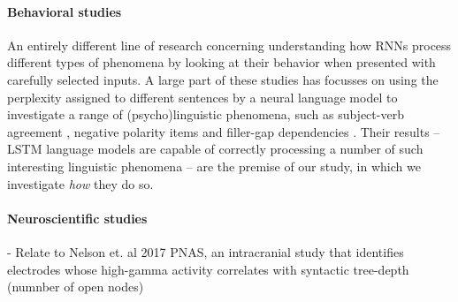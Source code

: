 \paragraph{Behavioral studies}
An entirely different line of research concerning understanding how RNNs process different types of phenomena by looking at their behavior when presented with carefully selected inputs.
A large part of these studies has focusses on using the perplexity assigned to different sentences by a neural language model to investigate a range of (psycho)linguistic phenomena, such as subject-verb agreement \cite{Linzen:etal:2016,Bernardy:Lappin:2017,Gulordava:etal:2018,Kuncoro:etal:2018a,Kuncoro:etal:2018b,Linzen:Leonard:2018}, negative polarity items \cite{marvin2018targeted,jumelet2018language} and filler-gap dependencies \cite{wilcox2018rnn}.
Their results -- LSTM language models are capable of correctly processing a number of such interesting linguistic phenomena -- are the premise of our study, in which we investigate \textit{how} they do so.

\paragraph{Neuroscientific studies}
- Relate to Nelson et. al 2017 PNAS, an intracranial study that identifies electrodes whose high-gamma activity correlates with syntactic tree-depth (numnber of open nodes)
